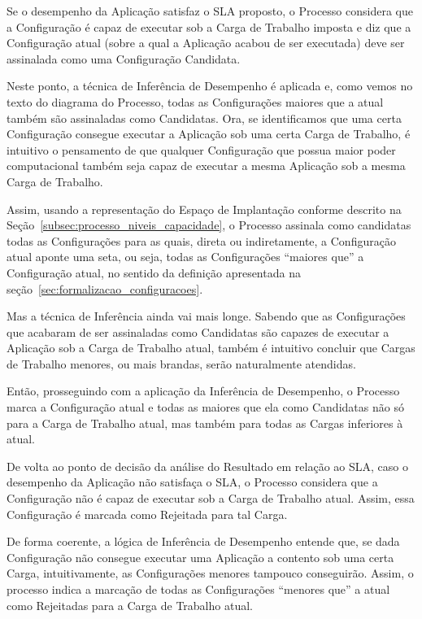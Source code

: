 Se o desempenho da Aplicação satisfaz o SLA proposto, o Processo considera que a
Configuração é capaz de executar sob a Carga de Trabalho imposta e diz que a 
Configuração atual (sobre a qual a Aplicação acabou de ser executada) deve ser
assinalada como uma Configuração Candidata.

Neste ponto, a técnica de Inferência de Desempenho é aplicada e, como vemos
no texto do diagrama do Processo, todas as Configurações maiores que a atual também
são assinaladas como Candidatas. Ora, se identificamos que uma certa Configuração
consegue executar a Aplicação sob uma certa Carga de Trabalho, é intuitivo o 
pensamento de que qualquer Configuração que possua maior poder computacional 
também seja capaz de executar a mesma Aplicação sob a mesma Carga de Trabalho.

Assim, usando a representação do Espaço de Implantação conforme descrito na
Seção~\ref{subsec:processo_niveis_capacidade}, o Processo assinala como candidatas
todas as Configurações para as quais, direta ou indiretamente, a Configuração 
atual aponte uma seta, ou seja, todas as Configurações ``maiores que'' a Configuração
atual, no sentido da definição apresentada na seção~\ref{sec:formalizacao_configuracoes}.

Mas a técnica de Inferência ainda vai mais longe. Sabendo que as Configurações
que acabaram de ser assinaladas como Candidatas são capazes de executar a Aplicação
sob a Carga de Trabalho atual, também é intuitivo concluir que Cargas de Trabalho 
menores, ou mais brandas, serão naturalmente atendidas.

Então, prosseguindo com a aplicação da Inferência de Desempenho, o Processo marca
a Configuração atual e todas as maiores que ela como Candidatas não só para a 
Carga de Trabalho atual, mas também para todas as Cargas inferiores à atual.

De volta ao ponto de decisão da análise do Resultado em relação ao SLA, caso o 
desempenho da Aplicação não satisfaça o SLA, o Processo considera que a 
Configuração não é capaz de executar sob a Carga de Trabalho atual. Assim, essa
Configuração é marcada como Rejeitada para tal Carga.

De forma coerente, a lógica de Inferência de Desempenho entende que, se dada 
Configuração não consegue executar uma Aplicação a contento sob uma certa Carga,
intuitivamente, as Configurações menores tampouco conseguirão. Assim, o processo
indica a marcação de todas as Configurações ``menores que'' a atual como 
Rejeitadas para a Carga de Trabalho atual. 

